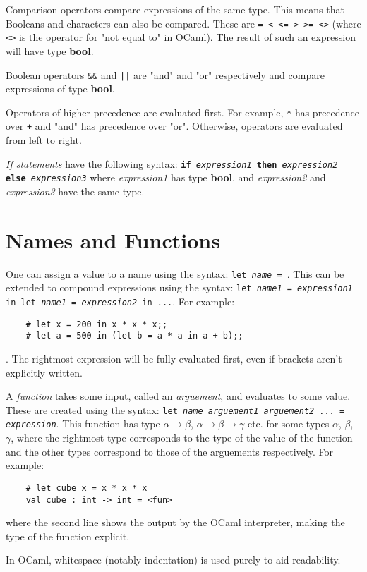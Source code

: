 \documentclass[12pt]{article}
\begin{document}
Comparison operators compare expressions of the same type. This means that Booleans and characters can
also be compared. These are \texttt{= < <= > >= <>} (where \texttt{<>}
is the operator for "not equal to" in OCaml). The result of such an expression will have type \textbf{bool}.

Boolean operators \texttt{\&\&} and \texttt{||} are "and" and "or" respectively and compare expressions
of type \textbf{bool}.

Operators of higher precedence are evaluated first. For example, \texttt{*} has precedence over \texttt{+}
and "and" has precedence over "or". Otherwise, operators are evaluated from left to right.

\textit{If statements} have the following syntax: \texttt{\textbf{if} \textit{expression1} \textbf{then}
\textit{expression2} \textbf{else} \textit{expression3}} where \textit{expression1} has type \textbf{bool}, and
\textit{expression2} and \textit{expression3} have the same type.

\section{Names and Functions}
One can assign a value to a name using the syntax: \texttt{let \textit{name} = }. This can
be extended to compound expressions using the syntax: \texttt{let \textit{name1} = \textit{expression1} in let \textit{name1}
= \textit{expression2} in ...}. For example:
\begin{lstlisting}
    # let x = 200 in x * x * x;;
    # let a = 500 in (let b = a * a in a + b);;
\end{lstlisting}. The rightmost expression will be fully evaluated first, even if brackets aren't explicitly
written.

A \textit{function} takes some input, called an \textit{arguement}, and evaluates to some value. These are
created using the syntax: \texttt{let \textit{name arguement1 arguement2} ... = \textit{expression}}.
This function has type $\alpha \rightarrow \beta$, $\alpha \rightarrow \beta \rightarrow \gamma$ etc. for
some types $\alpha$, $\beta$, $\gamma$, where the rightmost type corresponds to the type of the value of
the function and the other types correspond to those of the arguements respectively. For example:
\begin{lstlisting}
    # let cube x = x * x * x
    val cube : int -> int = <fun>
\end{lstlisting}
where the second line shows the output by the OCaml interpreter, making the type of the function explicit.

In OCaml, whitespace (notably indentation) is used purely to aid readability.
\end{document}
